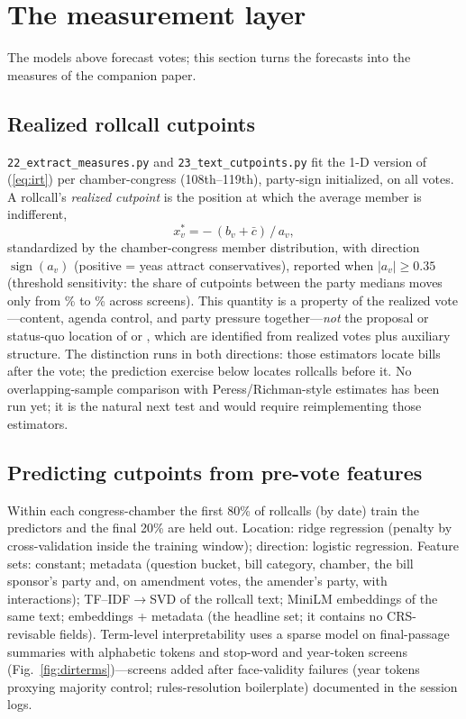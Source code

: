 \documentclass[11pt]{article}
\newcommand{\code}[1]{\texttt{#1}}
\begin{document}
\section{The measurement layer}
\label{sec:measurement}

The models above forecast votes; this section turns the forecasts into
the measures of the companion paper.

\subsection{Realized rollcall cutpoints}
\label{sec:cutpoints}

\code{22\_extract\_measures.py} and \code{23\_text\_cutpoints.py} fit
the 1-D version of (\ref{eq:irt}) per chamber-congress (108th--119th),
party-sign initialized, on all votes. A rollcall's \emph{realized
cutpoint} is the position at which the average member is indifferent,
\begin{equation}
x^*_v = -\,(b_v + \bar c)\,/\,a_v,
\end{equation}
standardized by the chamber-congress member distribution, with
direction $\operatorname{sign}(a_v)$ (positive = yeas attract
conservatives), reported when $|a_v| \ge 0.35$ (threshold sensitivity:
the share of cutpoints between the party medians moves only from
\cutBetweenPartiesLo\% to \cutBetweenPartiesHi\% across screens). This
quantity is a property of the realized vote---content, agenda control,
and party pressure together---\emph{not} the proposal or status-quo
location of \citet{peress2013estimating} or \citet{richman2011parties},
which are identified from realized votes plus auxiliary structure. The
distinction runs in both directions: those estimators locate bills after
the vote; the prediction exercise below locates rollcalls before it. No
overlapping-sample comparison with Peress/Richman-style estimates has
been run yet; it is the natural next test and would require
reimplementing those estimators.

\subsection{Predicting cutpoints from pre-vote features}

Within each congress-chamber the first 80\% of rollcalls (by date) train
the predictors and the final 20\% are held out. Location: ridge
regression (penalty by cross-validation inside the training window);
direction: logistic regression. Feature sets: constant; metadata
(question bucket, bill category, chamber, the bill sponsor's party and,
on amendment votes, the amender's party, with interactions);
TF--IDF$\to$SVD of the rollcall text; MiniLM embeddings of the same
text; embeddings + metadata (the headline set; it contains no
CRS-revisable fields). Term-level interpretability uses a sparse model
on final-passage summaries with alphabetic tokens and stop-word and
year-token screens (Fig.~\ref{fig:dirterms})---screens added after
face-validity failures (year tokens proxying majority control;
rules-resolution boilerplate) documented in the session logs.
\end{document}
